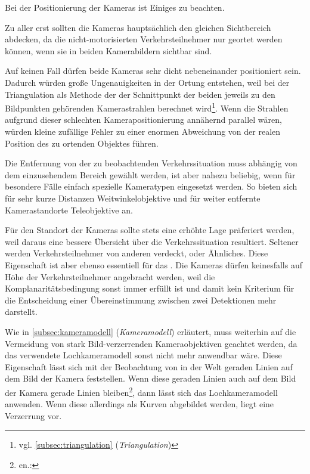 Bei der Positionierung der Kameras ist Einiges zu beachten.\kleinerabstand

\noindent Zu aller erst sollten die Kameras hauptsächlich den gleichen Sichtbereich abdecken, da die nicht-motorisierten Verkehrsteilnehmer nur geortet werden können, wenn sie in beiden Kamerabildern sichtbar sind.\kleinerabstand

\noindent Auf keinen Fall dürfen beide Kameras sehr dicht nebeneinander positioniert sein. Dadurch würden große Ungenauigkeiten in der Ortung entstehen, weil bei der Triangulation als Methode der  der Schnittpunkt der beiden jeweils zu den Bildpunkten gehörenden Kamerastrahlen berechnet wird\footnote{vgl. \ref{subsec:triangulation} (\emph{Triangulation})}. Wenn die Strahlen aufgrund dieser schlechten Kamerapositionierung annähernd parallel wären, würden kleine zufällige Fehler zu einer enormen Abweichung von der realen Position des zu ortenden Objektes führen.\kleinerabstand

\noindent Die Entfernung von der zu beobachtenden Verkehrssituation muss abhängig von dem einzusehendem Bereich gewählt werden, ist aber nahezu beliebig, wenn für besondere Fälle einfach spezielle Kameratypen eingesetzt werden. So bieten sich für sehr kurze Distanzen Weitwinkelobjektive und für weiter entfernte Kamerastandorte Teleobjektive an.\kleinerabstand

\noindent Für den Standort der Kameras sollte stets eine erhöhte Lage präferiert werden, weil daraus eine bessere Übersicht über die Verkehrssituation resultiert. Seltener werden Verkehrsteilnehmer von anderen verdeckt, oder Ähnliches. Diese Eigenschaft ist aber ebenso essentiell für das . Die Kameras dürfen keinesfalls auf Höhe der Verkehrsteilnehmer angebracht werden, weil die Komplanaritätsbedingung sonst immer erfüllt ist und damit kein Kriterium für die Entscheidung einer Übereinstimmung zwischen zwei Detektionen mehr darstellt.\kleinerabstand

\noindent Wie in \ref{subsec:kameramodell} (\emph{Kameramodell}) erläutert, muss weiterhin auf die Vermeidung von stark Bild-verzerrenden Kameraobjektiven geachtet werden, da das verwendete Lochkameramodell sonst nicht mehr anwendbar wäre. Diese Eigenschaft lässt sich mit der Beobachtung von in der Welt geraden Linien auf dem Bild der Kamera feststellen. Wenn diese geraden Linien auch auf dem Bild der Kamera gerade Linien bleiben\footnote{en.: }, dann lässt sich das Lochkameramodell anwenden. Wenn diese allerdings als Kurven abgebildet werden, liegt eine Verzerrung vor.\mittelgrosserabstand


